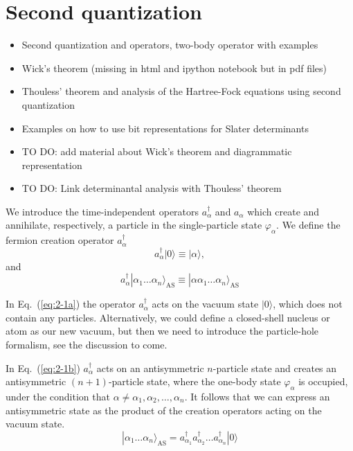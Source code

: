 \documentclass[graybox,sectrefs,envcountresetchap,open=right]{svmonodo}
\begin{document}
\section{Second quantization}
\begin{itemize}
\item Second quantization and operators, two-body operator with examples 

\item Wick's theorem (missing in html and ipython notebook but in pdf files)

\item Thouless' theorem and analysis of the Hartree-Fock equations using second quantization

\item Examples on how to use bit representations for Slater determinants

\item TO DO: add material about Wick's theorem and diagrammatic representation

\item TO DO: Link determinantal analysis with Thouless' theorem
\end{itemize}

\noindent
We introduce the time-independent  operators
$a_\alpha^{\dagger}$ and $a_\alpha$   which create and annihilate, respectively, a particle 
in the single-particle state 
$\varphi_\alpha$. 
We define the fermion creation operator
$a_\alpha^{\dagger}$ 
\begin{equation}
	a_\alpha^{\dagger}|0\rangle \equiv  |\alpha\rangle  \label{eq:2-1a},
\end{equation}
and
\begin{equation}
	a_\alpha^{\dagger}|\alpha_1\dots \alpha_n\rangle_{\mathrm{AS}} \equiv  |\alpha\alpha_1\dots \alpha_n\rangle_{\mathrm{AS}} \label{eq:2-1b}
\end{equation}



In Eq.~(\ref{eq:2-1a}) 
the operator  $a_\alpha^{\dagger}$  acts on the vacuum state 
$|0\rangle$, which does not contain any particles. Alternatively, we could define  a closed-shell nucleus or atom as our new vacuum, but then
we need to introduce the particle-hole  formalism, see the discussion to come. 

In Eq.~(\ref{eq:2-1b}) $a_\alpha^{\dagger}$ acts on an antisymmetric $n$-particle state and 
creates an antisymmetric $(n+1)$-particle state, where the one-body state 
$\varphi_\alpha$ is occupied, under the condition that
$\alpha \ne \alpha_1, \alpha_2, \dots, \alpha_n$. 
It follows that we can express an antisymmetric state as the product of the creation
operators acting on the vacuum state.  
\begin{equation}
	|\alpha_1\dots \alpha_n\rangle_{\mathrm{AS}} = a_{\alpha_1}^{\dagger} a_{\alpha_2}^{\dagger} \dots a_{\alpha_n}^{\dagger} |0\rangle \label{eq:2-2}
\end{equation}
\end{document}
